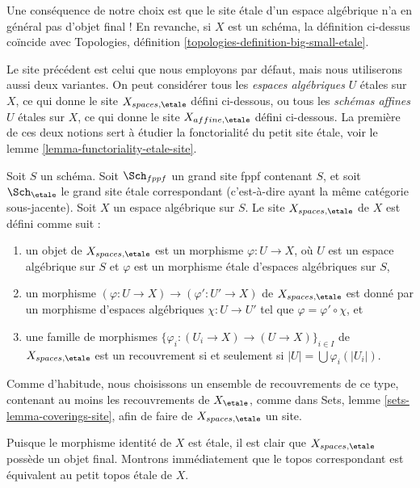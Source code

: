 \noindent
Une conséquence de notre choix est que le site \'etale d'un espace algébrique
n'a en général pas d'objet final ! En revanche, si $X$ est
un schéma, la définition ci-dessus coïncide avec
Topologies, définition \ref{topologies-definition-big-small-etale}.

\medskip\noindent
Le site précédent est celui que nous employons par défaut, mais nous utiliserons aussi
deux variantes. On peut considérer tous les {\it espaces algébriques}
$U$ \'etales sur $X$, ce qui donne le site
$X_{spaces, \etale}$ défini ci-dessous, ou tous les {\it schémas affines}
$U$ \'etales sur $X$, ce qui donne le site
$X_{affine, \etale}$ défini ci-dessous. La première de ces deux notions
sert à étudier la fonctorialité du petit site \'etale, voir le
lemme \ref{lemma-functoriality-etale-site}.

\begin{definition}
\label{definition-spaces-etale-site}
Soit $S$ un schéma.
Soit $\Sch_{fppf}$ un grand site fppf contenant $S$,
et soit $\Sch_\etale$ le grand site \'etale correspondant
(c'est-à-dire ayant la même catégorie sous-jacente).
Soit $X$ un espace algébrique sur $S$.
Le site {\it $X_{spaces, \etale}$} de $X$ est défini comme suit :
\begin{enumerate}
\item un objet de $X_{spaces, \etale}$ est un morphisme
$\varphi : U \to X$, où $U$ est un espace algébrique sur $S$ et
$\varphi$ est un morphisme \'etale d'espaces algébriques sur $S$,
\item un morphisme $(\varphi : U \to X) \to (\varphi' : U' \to X)$ de
$X_{spaces, \etale}$ est donné par un morphisme d'espaces algébriques
$\chi : U \to U'$ tel que $\varphi = \varphi' \circ \chi$, et
\item une famille de morphismes
$\{\varphi_i : (U_i \to X) \to (U \to X)\}_{i \in I}$
de $X_{spaces, \etale}$ est un recouvrement si et seulement si
$|U| = \bigcup \varphi_i(|U_i|)$.
\end{enumerate}
Comme d'habitude, nous choisissons un ensemble de recouvrements de ce type, contenant au moins
les recouvrements de $X_\etale$, comme dans
Sets, lemme \ref{sets-lemma-coverings-site},
afin de faire de $X_{spaces, \etale}$ un site.
\end{definition}

\noindent
Puisque le morphisme identité de $X$ est \'etale, il est clair que
$X_{spaces, \etale}$ possède un objet final.
Montrons immédiatement que le topos correspondant est équivalent au
petit topos \'etale de $X$.

